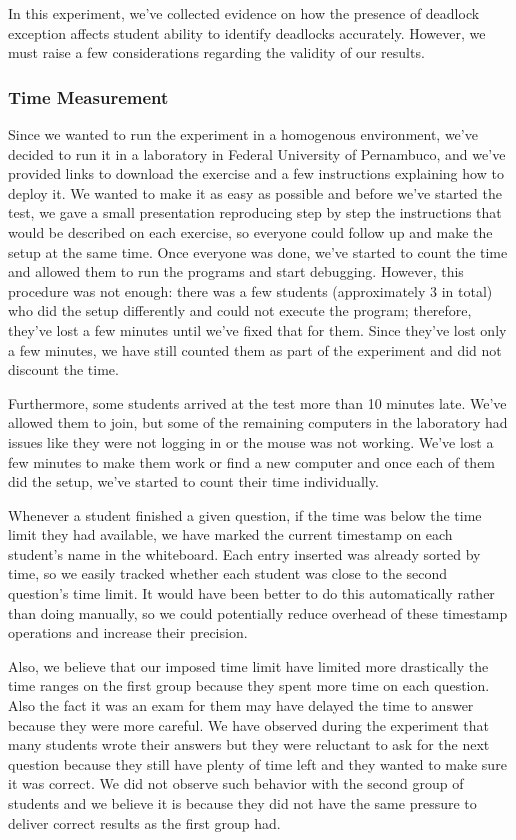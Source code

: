 In this experiment, we've collected evidence on how the presence of deadlock exception affects student ability to identify deadlocks accurately. However, we must raise a few considerations regarding the validity of our results.

\subsubsection{Time Measurement}

Since we wanted to run the experiment in a homogenous environment, we've decided to run it in a laboratory in Federal University of Pernambuco, and we've provided links to download the exercise and a few instructions explaining how to deploy it. We wanted to make it as easy as possible and before we've started the test, we gave a small presentation reproducing step by step the instructions that would be described on each exercise, so everyone could follow up and make the setup at the same time. Once everyone was done, we've started to count the time and allowed them to run the programs and start debugging. However, this procedure was not enough: there was a few students (approximately 3 in total) who did the setup differently and could not execute the program; therefore, they've lost a few minutes until we've fixed that for them. Since they've lost only a few minutes, we have still counted them as part of the experiment and did not discount the time.

Furthermore, some students arrived at the test more than 10 minutes late. We've allowed them to join, but some of the remaining computers in the laboratory had issues like they were not logging in or the mouse was not working. We've lost a few minutes to make them work or find a new computer and once each of them did the setup, we've started to count their time individually.

Whenever a student finished a given question, if the time was below the time limit they had available, we have marked the current timestamp on each student's name in the whiteboard. Each entry inserted was already sorted by time, so we easily tracked whether each student was close to the second question's time limit. It would have been better to do this automatically rather than doing manually, so we could potentially reduce overhead of these timestamp operations and increase their precision.

Also, we believe that our imposed time limit have limited more drastically the time ranges on the first group because they spent more time on each question. Also the fact it was an exam for them may have delayed the time to answer because they were more careful. We have observed during the experiment that many students wrote their answers but they were reluctant to ask for the next question because they still have plenty of time left and they wanted to make sure it was correct. We did not observe such behavior with the second group of students and we believe it is because they did not have the same pressure to deliver correct results as the first group had.

